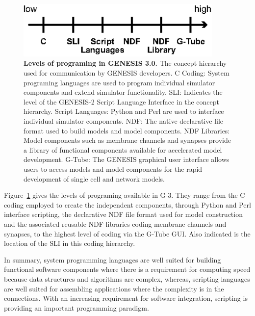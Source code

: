 \documentclass[10pt]{article}
\begin{document}
\begin{figure}[ht]
  \begin{center}
    \includegraphics[width=4in]{figures/g3-interfacing.eps}
  \end{center}
  \caption{ {\bf Levels of programing in GENESIS 3.0.} The concept
    hierarchy used for communication by GENESIS developers. C Coding:
    System programing languages are used to program individual
    simulator components and extend simulator functionality. SLI:
    Indicates the level of the GENESIS-2 Script Language Interface in
    the concept hierarchy. Script Languages: Python and Perl are used
    to interface individual simulator components. NDF: The native
    declarative file format used to build models and model components.
    NDF Libraries: Model components such as membrane channels and
    synapses provide a library of functional components available for
    accelerated model development. G-Tube: The GENESIS graphical user
    interface allows users to access models and model components for
    the rapid development of single cell and network models.  }
  \label{fig:g3-interfacing}
\end{figure}


Figure~\ref{fig:g3-interfacing} gives the levels of programing
available in G-3. They range from the C coding employed to create the
independent components, through Python and Perl interface scripting,
the declarative NDF file format used for model construction and the
associated reusable NDF libraries coding membrane channels and
synapses, to the highest level of coding via the G-Tube GUI. Also
indicated is the location of the SLI in this coding hierarchy.

In summary, system programming languages are well suited for building functional software
components where there is a requirement for computing speed because data structures and
algorithms are complex, whereas, scripting languages are well suited for assembling
applications where the complexity is in the connections. With an
increasing requirement for software integration, scripting is
providing an important programming paradigm.

\end{document}
